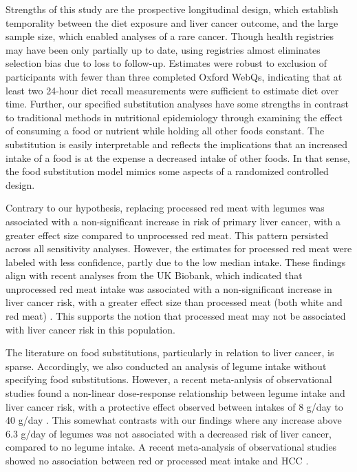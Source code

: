 \documentclass[sn-basic,Numbered,iicol,pdflatex]{sn-jnl}
\begin{document}
Strengths of this study are the prospective longitudinal design, which
establish temporality between the diet exposure and liver cancer
outcome, and the large sample size, which enabled analyses of a rare
cancer. Though health registries may have been only partially up to
date, using registries almost eliminates selection bias due to loss to
follow-up. Estimates were robust to exclusion of participants with fewer
than three completed Oxford WebQs, indicating that at least two 24-hour
diet recall measurements were sufficient to estimate diet over time.
Further, our specified substitution analyses have some strengths in
contrast to traditional methods in nutritional epidemiology through
examining the effect of consuming a food or nutrient while holding all
other foods constant. The substitution is easily interpretable and
reflects the implications that an increased intake of a food is at the
expense a decreased intake of other foods. In that sense, the food
substitution model mimics some aspects of a randomized controlled
design.

Contrary to our hypothesis, replacing processed red meat with legumes
was associated with a non-significant increase in risk of primary liver
cancer, with a greater effect size compared to unprocessed red meat.
This pattern persisted across all sensitivity analyses. However, the
estimates for processed red meat were labeled with less confidence,
partly due to the low median intake. These findings align with recent
analyses from the UK Biobank, which indicated that unprocessed red meat
intake was associated with a non-significant increase in liver cancer
risk, with a greater effect size than processed meat (both white and red
meat) \citep{Knuppel2020}. This supports the notion that processed meat may
not be associated with liver cancer risk in this population.

The literature on food substitutions, particularly in relation to liver
cancer, is sparse. Accordingly, we also conducted an analysis of legume
intake without specifying food substitutions. However, a recent
meta-anlysis of observational studies found a non-linear dose-response
relationship between legume intake and liver cancer risk, with a
protective effect observed between intakes of 8 g/day to 40 g/day
\citep{liu2023a}. This somewhat contrasts with our findings where any
increase above 6.3 g/day of legumes was not associated with a decreased
risk of liver cancer, compared to no legume intake. A recent
meta-analysis of observational studies showed no association between red
or processed meat intake and HCC \citep{Di2023}.
\end{document}
